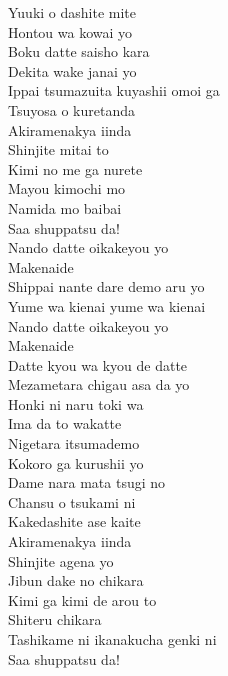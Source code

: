 \def\songtitle{Yuuki wa doko ni? Kimi no mune ni!}
\def\songcomment{Season 2 Ending Theme}
\def\songlyrics{Aki Hata}
\def\songwriter{Odaka Koutarou \& UiNA}
\def\songarrange{Odaka Koutarou}
   
\ifdefined\COMPLETE
\else
	
	
\fi
\thispagestyle{song}

{\small{}}
\begin{multicols}{2}
Yuuki o dashite mite\\
Hontou wa kowai yo\\
Boku datte saisho kara\\
Dekita wake janai yo\\
Ippai tsumazuita kuyashii omoi ga\\
Tsuyosa o kuretanda\\
Akiramenakya iinda\\

Shinjite mitai to\\
Kimi no me ga nurete\\
Mayou kimochi mo\\
Namida mo baibai\\
Saa shuppatsu da!\\

Nando datte oikakeyou yo\\
Makenaide\\
Shippai nante dare demo aru yo\\
Yume wa kienai yume wa kienai\\
Nando datte oikakeyou yo\\
Makenaide\\
Datte kyou wa kyou de datte\\
Mezametara chigau asa da yo\\

Honki ni naru toki wa\\
Ima da to wakatte\\
Nigetara itsumademo\\
Kokoro ga kurushii yo\\
Dame nara mata tsugi no\\
Chansu o tsukami ni\\
Kakedashite ase kaite\\
Akiramenakya iinda\\

Shinjite agena yo\\
Jibun dake no chikara\\
Kimi ga kimi de arou to\\
Shiteru chikara\\
Tashikame ni ikanakucha genki ni\\
Saa shuppatsu da!\columnbreak


\end{multicols}
